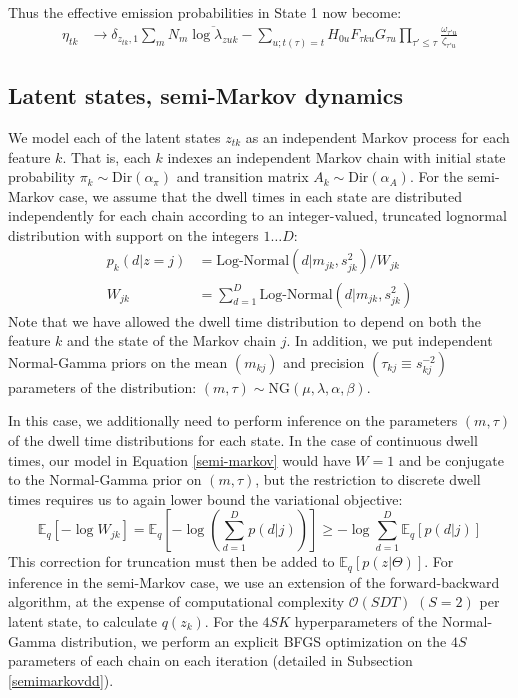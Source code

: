 \documentclass[12pt,a4paper]{article}
\begin{document}
\begin{flushleft}
Thus the effective emission probabilities in State 1 now become:
\begin{align}
    \eta_{tk} &\rightarrow \delta_{z_{tk}, 1} \sum_{m} N_m \overline{\log \lambda_{zuk}}
    - \sum_{u; t(\tau) = t} H_{0u} F_{\tau ku} G_{\tau u} \prod_{\tau' \le \tau} \frac{\omega_{\tau' u}}{\zeta_{\tau' u}}
\end{align}


\subsection{Latent states, semi-Markov dynamics}

We model each of the latent states $z_{tk}$ as an independent Markov process for each feature $k$. That is, each $k$ indexes an independent Markov chain with initial state probability $\pi_k\sim \text{Dir}(\alpha_\pi)$ and transition matrix $A_k\sim \text{Dir}(\alpha_A)$. For the semi-Markov case, we assume that the dwell times in each state are distributed independently for each chain according to an integer-valued, truncated lognormal distribution with support on the integers $1\dots D$:
\begin{align}
    \label{semi-markov}
    p_k(d|z = j) &= \text{Log-Normal}(d|m_{jk}, s^2_{jk}) / W_{jk}  \\
    W_{jk} &= \sum_{d = 1}^D \text{Log-Normal}(d|m_{jk}, s^2_{jk})
\end{align}
Note that we have allowed the dwell time distribution to depend on both the feature $k$ and the state of the Markov chain $j$. In addition, we put independent Normal-Gamma priors on the mean $(m_{kj})$ and precision $(\tau_{kj} \equiv s_{kj}^{-2})$ parameters of the distribution: $(m, \tau) \sim \text{NG}(\mu, \lambda, \alpha, \beta)$.

In this case, we additionally need to perform inference on the parameters $(m, \tau)$ of the dwell time distributions for each state. In the case of continuous dwell times, our model in Equation \ref{semi-markov} would have $W = 1$ and be conjugate to the Normal-Gamma prior on $(m, \tau)$, but the restriction to discrete dwell times requires us to again lower bound the variational objective:
\begin{equation}
    \mathbb{E}_q\left[-\log W_{jk} \right] =
    \mathbb{E}_q\left[- \log \left( \sum_{d=1}^D p(d|j)\right) \right]
    \ge -\log \sum_{d = 1}^D \mathbb{E}_q\left[p(d|j)\right]
\end{equation}
This correction for truncation must then be added to $\mathbb{E}_q[p(z|\Theta)]$. For inference in the semi-Markov case, we use an extension of the forward-backward algorithm\cite{Yu2006-bb}, at the expense of computational complexity $\mathcal{O}(SDT)$ $(S = 2)$ per latent state, to calculate $q(z_k)$. For the $4SK$ hyperparameters of the Normal-Gamma distribution, we perform an explicit BFGS optimization on the $4S$ parameters of each chain on each iteration (detailed in Subsection \ref{semimarkovdd}).



\end{flushleft}
\end{document}
